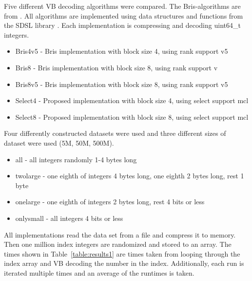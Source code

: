 Five different VB decoding algorithms were compared. The Bris-algorithms are from \citep{Bri09}. All algorithms are implemented using data structures and functions from the SDSL 
library \citep{gbmp2014sea}. Each implementation is compressing and decoding uint64\_t integers.

\begin{itemize}
  \item Bris4v5 - Bris implementation with block size 4, using rank support v5
  \item Bris8 - Bris implementation with block size 8, using rank support v
  \item Bris8v5 - Bris implementation with block size 8, using rank support v5
  \item Select4 - Proposed implementation with block size 4, using select support mcl
  \item Select8 - Proposed implementation with block size 8, using select support mcl
\end{itemize}






Four differently constructed datasets were used and three different sizes of dataset were used (5M, 50M, 500M). 

\begin{itemize}
  \item all - all integers randomly 1-4 bytes long
  \item twolarge - one eighth of integers 4 bytes long, one eighth 2 bytes long, rest 1 byte    
  \item onelarge - one eighth of integers 2 bytes long, rest 4 bits or less
  \item onlysmall - all integers 4 bits or less
\end{itemize}

All implementations read the data set from a file and compress it to memory. Then one million index integers are randomized and stored to an array. The times shown in Table~\ref{table:results1} 
are times taken from looping through the index array and VB decoding the number in the index. Additionally, each run is iterated multiple times and an average of the runtimes is taken. 

